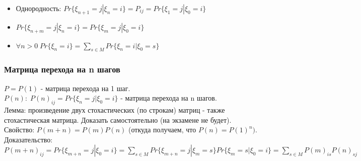 \begin{itemize}
$Pr\{\xi_{n + k + 1} = j | \xi_0 = i_0, \; ... \; , \xi_n = i\} = \frac{Pr\{\xi_{n + k + 1} = j, \xi_0 = i_0, \; ... \; , \xi_n = i\}}{Pr\{\xi_0 = i_0, \; ... \; , \xi_n = i\}} = \sum\limits_{s \in M} \frac{Pr\{\xi_{n + k + 1} = j, \xi_{n + k} = s, \xi_0 = i_0, \; ... \; , \xi_n = i\}}{Pr\{\xi_0 = i_0, \; ... \; , \xi_n = i\}} = \sum\limits_{s \in M} \frac{P_{sj}Pr\{\xi_{n + k} = s, \xi_0 = i_0, \; ... \; , \xi_n = i\}}{Pr\{\xi_0 = i_0, \; ... \; , \xi_n = i\}} = \sum\limits_{s \in M} P_{sj}Pr\{\xi_{n + k} = s | \xi_0 = i_0, \; ... \; , \xi_n = i\} = \sum\limits_{s \in M} Pr\{\xi_{n + k + 1} = j | \xi_{n + k} = s\}Pr\{\xi_{n + k} = s | \xi_n = i\} = \sum\limits_{s \in M} \frac{Pr\{\xi_{n + k + 1} = j | \xi_{n + k} = s, \xi_{n} = i\}Pr\{\xi_{n + k} = s, \xi_n = i\}}{Pr\{\xi_n = i} = \sum\limits_{s \in M} \frac{Pr\{\xi_{n + k + 1} = j, \xi_{n + k} = s, \xi_n = i\}}{Pr\{\xi_n = i} = \sum\limits_{s \in M} \frac{Pr\{\xi_{n + k} = s | \xi_{n + k + 1} = j, \xi_n = i\}Pr\{\xi_{n + k + 1} = j, \xi_n = i\}}{Pr\{\xi_n = i} = \frac{Pr\{\xi_{n + k + 1} = j, \xi_n = i\}}{Pr\{\xi_n = i} \sum\limits_{s \in M} Pr\{\xi_{n + k} = s | \xi_{n + k + 1} = j, \xi_n = i\} = Pr\{\xi_{n + k + 1} = j | \xi_n = i\} * 1 = Pr\{\xi_{n + k + 1} = j | \xi_n = i\}$\\
\item Однородность: $Pr\{\xi_{n + 1} = j | \xi_n = i\} = P_{ij} = Pr\{\xi_1 = j | \xi_0 = i\}$\\
\item $Pr\{\xi_{n + m} = j | \xi_n = i\} = Pr\{\xi_m = j | \xi_0 = i\}$
\item $\forall n > 0 \; Pr\{\xi_n = i\} = \sum\limits_{s \in M} Pr\{\xi_n = i | \xi_0 = s\}$\\
\end{itemize}
\subsubsection{Матрица перехода на n шагов}
$P = P(1)$ - матрица перехода на 1 шаг.\\
$P(n): \; P(n)_{ij} = Pr\{\xi_n = j | \xi_0 = i\}$ - матрица перехода на n шагов.\\
Лемма: произведение двух стохастических (по строкам) матриц - также стохастическая матрица. Доказать самостоятельно (на экзамене не будет).\\
Свойство: $P(m + n) = P(m)P(n)$ (откуда получаем, что $P(n) = P(1)^n)$.\\
Доказательство: \\
$P(m + n)_{ij} = Pr\{\xi_{m + n} = j | \xi_0 = i\} = \sum\limits_{s \in M}Pr\{\xi_{m + n} = j | \xi_m = s\}Pr\{\xi_{m} = s | \xi_0 = i\} = \sum\limits_{s \in M} P(m)_{is}P(n)_{sj}$\\
